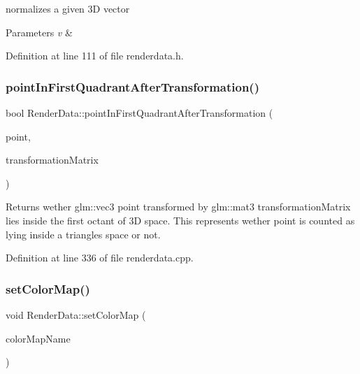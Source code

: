 normalizes a given 3D vector 
\begin{DoxyParams}{Parameters}
{\em v} & \\
\hline
\end{DoxyParams}


Definition at line 111 of file renderdata.\+h.

\mbox{\label{class_render_data_a7b32e615d46ac5ffbd3d14de0da2c406}} 
\subsubsection{\texorpdfstring{point\+In\+First\+Quadrant\+After\+Transformation()}{pointInFirstQuadrantAfterTransformation()}}
{\footnotesize\ttfamily bool Render\+Data\+::point\+In\+First\+Quadrant\+After\+Transformation (\begin{DoxyParamCaption}\item[{const glm\+::vec3 \&}]{point,  }\item[{const glm\+::mat3 \&}]{transformation\+Matrix }\end{DoxyParamCaption})\hspace{0.3cm}{\ttfamily [private]}}

\begin{DoxyReturn}{Returns}
wether glm\+::vec3 point transformed by glm\+::mat3 transformation\+Matrix lies inside the first octant of 3D space. This represents wether point is counted as lying inside a triangle\textquotesingle{}s space or not. 
\end{DoxyReturn}


Definition at line 336 of file renderdata.\+cpp.

\mbox{\label{class_render_data_adb1961bf93370d67c9efb416fde8fefb}} 
\subsubsection{\texorpdfstring{set\+Color\+Map()}{setColorMap()}}
{\footnotesize\ttfamily void Render\+Data\+::set\+Color\+Map (\begin{DoxyParamCaption}\item[{Q\+String}]{color\+Map\+Name }\end{DoxyParamCaption})}

